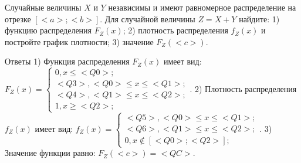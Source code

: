 \documentclass{article}%
\begin{document}
\begin{problem}
Случайные величины $X$ и $Y$ независимы и имеют равномерное
распределение на отрезке $[<a>;<b>]$. Для случайной величины $Z=X+Y$ найдите:
1) функцию распределения $F_Z(x)$;
2) плотность распределения $f_Z(x)$ и постройте график плотности;
3) значение $F_Z(<c>)$.
\end{problem}

\begin{solution*}
Ответы
1) Функция распределения $F_Z(x)$ имеет вид:
$
F_Z(x)=\left\{
\begin{array}{l}
0, x\leqslant <Q0>;\\
<Q3>, <Q0>\leqslant x\leqslant <Q1>;\\
<Q4>, <Q1>\leqslant x\leqslant <Q2>;\\
1, x\geqslant <Q2>;
\end{array}.
\right.
$
2) Плотность распределения $f_Z(x)$ имеет вид:
$
f_Z(x)=\left\{
\begin{array}{l}
<Q5>, <Q0>\leqslant x\leqslant <Q1>;\\
<Q6>, <Q1>\leqslant x\leqslant <Q2>;\\
0, x\not\in [<Q0>;<Q2>];
\end{array}.
\right.
$
3) Значение функции равно:
$
F_Z(<c>)=<QC>.
$
\end{solution*}
\end{document}
